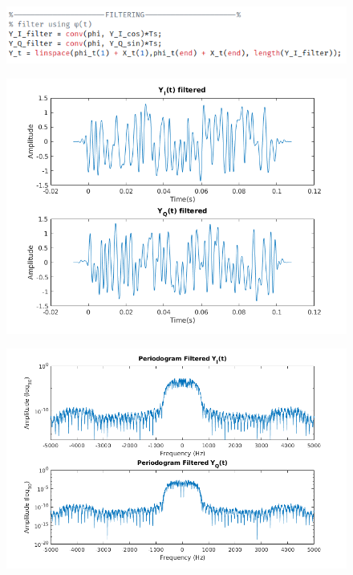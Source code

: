 \documentclass[12pt, a4paper]{article}
\begin{document}
\begin{enumerate}
\begin{enumerate}
        \begin{figure}[H]
            \centering
            \includegraphics[scale=0.75]{conv_fil.png}
        \end{figure}
        \begin{figure}[H]
            \centering
            \includegraphics[scale=0.75]{Y_I_Q_filtered_after.png}
        \end{figure}
        \begin{figure}[H]
            \centering
            \includegraphics[scale=0.7]{periodo_filter_after.png}
        \end{figure}

\end{enumerate}
\end{enumerate}
\end{document}
